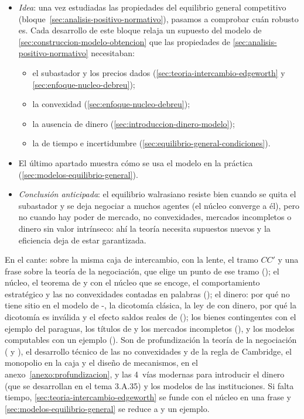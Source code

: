 \documentclass[11pt]{article}
\begin{document}
\begin{itemize}
\item \emph{Idea}: una vez estudiadas las propiedades del equilibrio general competitivo (bloque~\ref{sec:analisis-positivo-normativo}), pasamos a comprobar cuán robusto es. Cada desarrollo de este bloque relaja un supuesto del modelo de \ref{sec:construccion-modelo-obtencion} que las propiedades de \ref{sec:analisis-positivo-normativo} necesitaban:
  \begin{itemize}
  \item el subastador y los precios dados (\ref{sec:teoria-intercambio-edgeworth} y \ref{sec:enfoque-nucleo-debreu});
  \item la convexidad (\ref{sec:enfoque-nucleo-debreu});
  \item la ausencia de dinero (\ref{sec:introduccion-dinero-modelo});
  \item la de tiempo e incertidumbre (\ref{sec:equilibrio-general-condiciones}).
  \end{itemize}
\item El último apartado muestra cómo se usa el modelo en la práctica (\ref{sec:modelos-equilibrio-general}).
\item \emph{Conclusión anticipada}: el equilibrio walrasiano resiste bien cuando se quita el subastador y se deja negociar a muchos agentes (el núcleo converge a él), pero no cuando hay poder de mercado, no convexidades, mercados incompletos o dinero sin valor intrínseco: ahí la teoría necesita supuestos nuevos y la eficiencia deja de estar garantizada.
\end{itemize}

\begin{notaopositor}
En el cante:  sobre la misma caja de intercambio, con la lente, el tramo $CC'$ y una frase sobre la teoría de la negociación, que elige un punto de ese tramo (); el núcleo, el teorema de  y  con el núcleo que se encoge, el comportamiento estratégico y las no convexidades contadas en palabras (); el dinero: por qué no tiene sitio en el modelo de -, la dicotomía clásica, la ley de  con dinero, por qué la dicotomía es inválida y el efecto saldos reales de  (); los bienes contingentes con el ejemplo del paraguas, los títulos de  y los mercados incompletos (), y los modelos computables con un ejemplo (). Son de profundización la teoría de la negociación ( y ), el desarrollo técnico de las no convexidades y de la regla de Cambridge, el monopolio en la caja y el diseño de mecanismos, en el anexo~\ref{anexo:profundizacion}, y las 4~vías modernas para introducir el dinero (que se desarrollan en el tema 3.A.35) y los modelos de las instituciones. Si falta tiempo, \ref{sec:teoria-intercambio-edgeworth} se funde con el núcleo en una frase y \ref{sec:modelos-equilibrio-general} se reduce a  y un ejemplo.
\end{notaopositor}
\end{document}
